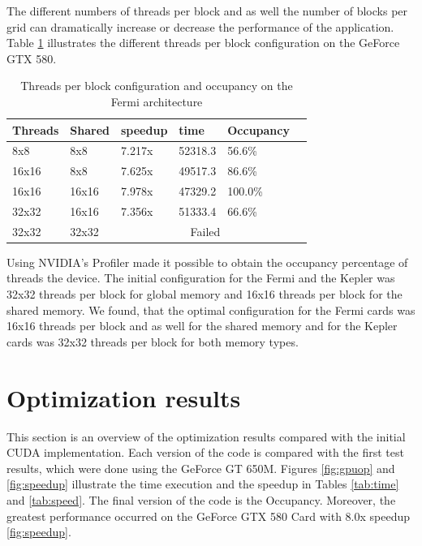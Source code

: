 The different numbers of threads per block and as well the number of blocks per grid can dramatically increase or decrease the performance of the application. Table \ref{tab:ocu} illustrates the different threads per block configuration on the GeForce GTX 580. 


\begin{table}[h]
\centering
  \begin{tabular} { | l | l | l | l | l | l | }
    \hline
    Threads & Shared & speedup & time & Occupancy \\
    \hline
     8x8 &  8x8 & 7.217x & 52318.3  & 56.6\% \\
    \hline
     16x16 & 8x8 & 7.625x & 49517.3 & 86.6\% \\
    \hline
    16x16 & 16x16 & 7.978x & 47329.2 & 100.0\% \\
    \hline
    32x32 & 16x16 & 7.356x & 51333.4 & 66.6\% \\
    \hline
    32x32 & 32x32 & \multicolumn{3}{|c|}{Failed}\\
    \hline
  \end{tabular}
  \caption{Threads per block configuration and occupancy on the Fermi architecture}
  \label{tab:ocu}
  \end{table}


Using NVIDIA's Profiler made it possible to obtain the occupancy percentage of threads the device. The initial configuration for the Fermi and the Kepler was 32x32 threads per block for global memory and 16x16 threads per block for the shared memory. We found, that the optimal configuration for the Fermi cards was 16x16 threads per block and as well for the shared memory and for the Kepler cards was 32x32 threads per block for both memory types. 

\section{Optimization results}

This section is an overview of the optimization results compared with the initial CUDA implementation. Each version of the code is compared with the first test results, which were done using the GeForce GT 650M. Figures \ref{fig:gpuop} and \ref{fig:speedup} illustrate the time execution and the speedup in Tables \ref{tab:time} and \ref{tab:speed}. The final version of the code is the Occupancy. Moreover, the greatest performance occurred on the GeForce GTX 580 Card with 8.0x speedup \ref{fig:speedup}.

